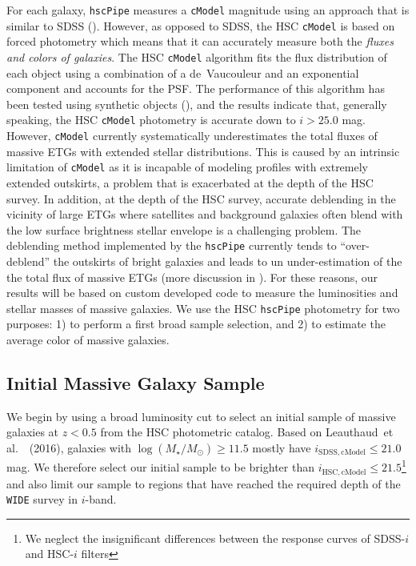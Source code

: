 \documentclass{emulateapj}
\def\etal{{\ et al.~}}
\def\cmodel{\texttt{cModel}}
\def\logms{{$\log (M_{\star}/M_{\odot})$}}
\begin{document}
\begin{CJK*}{UTF8}{gbsn}
    For each galaxy, \texttt{hscPipe} measures a \cmodel{} magnitude using an approach 
    that is similar to SDSS (\citealt{BoschInPrep}). 
    However, as opposed to SDSS, the HSC \cmodel{} is based on forced photometry which 
    means that it can accurately measure both the \textit{fluxes and colors of galaxies}. 
    The HSC \cmodel{} algorithm fits the flux distribution of each object using a 
    combination of a de~Vaucouleur and an exponential component and accounts for the PSF. 
    The performance of this algorithm has been tested using synthetic objects 
    (\citealt{SynPipeInPrep}), and the results indicate that, generally speaking, 
    the HSC \cmodel{} photometry is accurate down to $i >25.0$ mag.  
    However, \cmodel{} currently systematically underestimates the total fluxes of 
    massive ETGs with extended stellar distributions. 
    This is caused by an intrinsic limitation of \cmodel{} as it is incapable of
    modeling profiles with extremely extended outskirts, a problem that is exacerbated 
    at the depth of the HSC survey. 
    In addition, at the depth of the HSC survey, accurate deblending in the vicinity of
    large ETGs where satellites and background galaxies often blend with the low surface 
    brightness stellar envelope is a challenging problem. 
    The deblending method implemented by the \texttt{hscPipe} currently tends to 
    ``over-deblend'' the outskirts of bright galaxies and leads to un 
    under-estimation of the the total flux of massive ETGs (more discussion in 
    \citealt{BoschInPrep}).  
    For these reasons, our results will be based on custom developed code to measure 
    the luminosities and stellar masses of massive galaxies. 
    We use the HSC \texttt{hscPipe} photometry for two purposes: 
    1) to perform a first broad sample selection, and 2) to estimate the average 
    color of massive galaxies.
    
\subsection{Initial Massive Galaxy Sample}
    \label{ssec:initial}
    
    We begin by using a broad luminosity cut to select an initial sample of massive 
    galaxies at $z < 0.5$ from the HSC photometric catalog. 
    Based on Leauthaud\etal~(2016), galaxies with \logms{}$\geq 11.5$ mostly have 
    $i_{\mathrm{SDSS, cModel}} \leq 21.0$ mag. 
    We therefore select our initial sample to be brighter than 
    $i_{\mathrm{HSC, cModel}} \leq 21.5$\footnote{We neglect the insignificant 
    differences between the response curves of SDSS-$i$ and HSC-$i$ filters} 
    and also limit our sample to regions that have reached the required depth of 
    the \texttt{WIDE} survey in $i$-band.
    

\end{CJK*}
\end{document}
